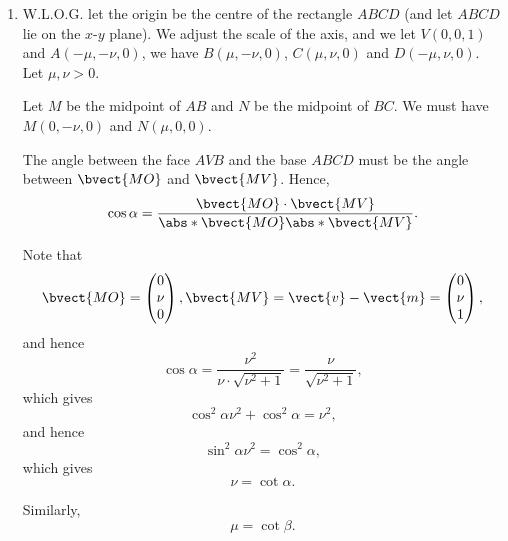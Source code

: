 \Question{\currfilebase}
\begin{enumerate}
    \item W.L.O.G. let the origin be the centre of the rectangle \(ABCD\) (and let \(ABCD\) lie on the \(x\)-\(y\) plane). We adjust the scale of the axis, and we let \(V(0, 0, 1)\) and \(A(-\mu, -\nu, 0)\), we have \(B(\mu, -\nu, 0)\), \(C(\mu, \nu, 0)\) and \(D(-\mu, \nu, 0)\). Let \(\mu, \nu > 0\).

          Let \(M\) be the midpoint of \(AB\) and \(N\) be the midpoint of \(BC\). We must have \(M(0, -\nu, 0)\) and \(N(\mu, 0, 0)\).

          The angle between the face \(AVB\) and the base \(ABCD\) must be the angle between \(\bvect{MO}\) and \(\bvect{MV}\). Hence,
          \[
              \cos \alpha = \frac{\bvect{MO} \cdot \bvect{MV}}{\abs*{\bvect{MO}} \abs*{\bvect{MV}}}.
          \]

          Note that
          \[
              \bvect{MO} = \begin{pmatrix}
                  0   \\
                  \nu \\
                  0
              \end{pmatrix},
              \bvect{MV} = \vect{v} - \vect{m} = \begin{pmatrix}
                  0   \\
                  \nu \\
                  1
              \end{pmatrix},
          \]
          and hence
          \[
              \cos \alpha = \frac{\nu^2}{\nu \cdot \sqrt{\nu^2 + 1}} = \frac{\nu}{\sqrt{\nu^2 + 1}},
          \]
          which gives
          \[
              \cos^2 \alpha \nu^2 + \cos^2 \alpha = \nu^2,
          \]
          and hence
          \[
              \sin^2 \alpha \nu^2 = \cos^2 \alpha,
          \]
          which gives
          \[
              \nu = \cot \alpha.
          \]

          Similarly,
          \[
              \mu = \cot \beta.
          \]


\end{enumerate}
